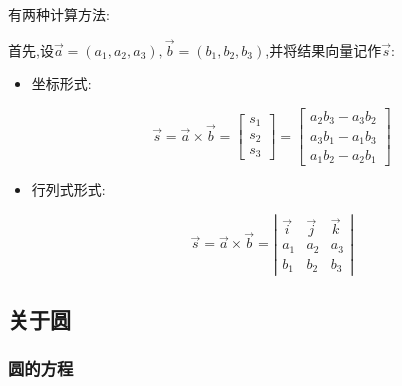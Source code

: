 {{{      有两种计算方法:

      首先,设$\vec{a} = (a_1,a_2,a_3),\vec{b} = (b_1,b_2,b_3)$,并将结果向量记作$\vec{s}$:

      \begin{itemize}
        \item {
              坐标形式:

              $$
                \vec{s}
                =
                \vec{a}\times\vec{b}
                =
                \begin{bmatrix}
                  s_1 \\
                  s_2 \\
                  s_3
                \end{bmatrix}
                =
                \begin{bmatrix}
                  a_2b_3 - a_3b_2 \\
                  a_3b_1 - a_1b_3 \\
                  a_1b_2 - a_2b_1
                \end{bmatrix}
              $$
              }
        \item {
              行列式形式:

              $$
                \vec{s}
                =
                \vec{a}\times\vec{b}
                =
                \left|\begin{array}{ccc}
                  \vec{i} & \vec{j} & \vec{k} \\
                  a_1     & a_2     & a_3     \\
                  b_1     & b_2     & b_3
                \end{array}\right|
              $$
              }
      \end{itemize}
    }%

  }%

  \subsection{关于圆}{

    \subsubsection{圆的方程}{
      \begin{center}
      \end{center}

}}}
